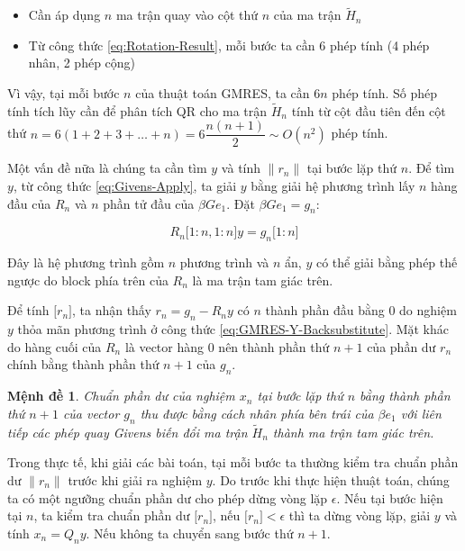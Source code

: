\documentclass[14pt, a4paper]{article}
\numberwithin{equation}{section}
\numberwithin{algorithm}{section}
\numberwithin{figure}{section}
\newtheorem{md}{Mệnh đề}
\numberwithin{dl}{section}
\numberwithin{md}{section}
\numberwithin{bd}{section}
\begin{document}
\begin{itemize}
    \item Cần áp dụng $n$ ma trận quay vào cột thứ $n$ của ma trận $\widetilde{H}_n$
    \item Từ công thức \ref{eq:Rotation-Result}, mỗi bước ta cần 6 phép tính (4 phép nhân, 2 phép cộng)
\end{itemize}

Vì vậy, tại mỗi bước $n$ của thuật toán GMRES, ta cần $6n$ phép tính. Số phép tính tích lũy cần để phân tích QR cho ma trận $\widetilde{H}_n$ tính từ cột đầu tiên đến cột thứ $n=6(1+2+3+\dots+n)=6\dfrac{n(n+1)}{2}\sim O(n^2)$
phép tính.

Một vấn đề nữa là chúng ta cần tìm $y$ và tính $\lVert r_n \rVert$ tại bước lặp thứ $n$.
Để tìm $y$, từ công thức \ref{eq:Givens-Apply}, ta giải $y$ bằng giải hệ phương trình lấy $n$ hàng đầu của $R_n$ và $n$ phần tử đầu của $\beta G e_1$. Đặt $\beta G e_1 = g_n$:

\begin{equation} \label{eq:GMRES-Y-Backsubstitute}
    R_n \lbrack 1:n,1:n \rbrack y = g_n \lbrack 1:n \rbrack
\end{equation}

Đây là hệ phương trình gồm $n$ phương trình và $n$ ẩn, $y$ có thể giải bằng phép thế ngược do block phía trên của $R_n$ là ma trận tam giác trên.

Để tính $\lbrack r_n \rbrack$, ta nhận thấy $r_n=g_n - R_n y$ có $n$ thành phần đầu bằng 0 do nghiệm $y$ thỏa mãn phương trình ở công thức \ref{eq:GMRES-Y-Backsubstitute}. Mặt khác do hàng cuối của $R_n$ là vector hàng 0 nên thành phần thứ $n+1$ của phần dư $r_n$ chính bằng thành phần thứ $n+1$ của $g_n$.

\begin{md}
    Chuẩn phần dư của nghiệm $x_n$ tại bước lặp thứ $n$ bằng thành phần thứ $n+1$ của vector $g_n$ thu được bằng cách nhân phía bên trái của $\beta e_1$ với liên tiếp các phép quay Givens biến đổi ma trận $\widetilde{H}_n$ thành ma trận tam giác trên.
\end{md}

Trong thực tế, khi giải các bài toán, tại mỗi bước ta thường kiểm tra chuẩn phần dư $\lVert r_n \rVert$ trước khi giải ra nghiệm $y$. Do trước khi thực hiện thuật toán, chúng ta có một ngưỡng chuẩn phần dư cho phép dừng vòng lặp $\epsilon$. Nếu tại bước hiện tại $n$, ta kiểm tra chuẩn phần dư $\lbrack r_n \rbrack$, nếu $\lbrack r_n \rbrack < \epsilon$ thì ta dừng vòng lặp, giải $y$ và tính $x_n=Q_n y$. Nếu không ta chuyển sang bước thứ $n+1$.
\end{document}
